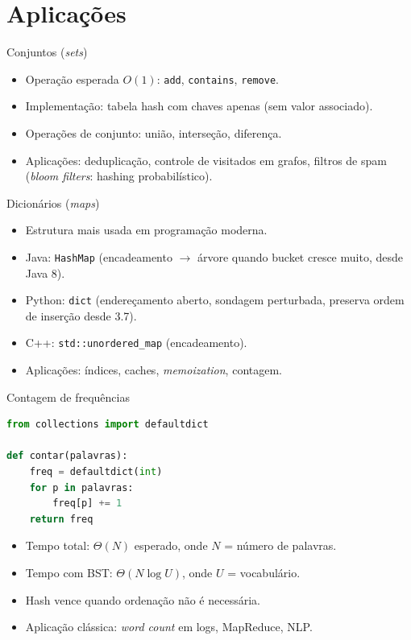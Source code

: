 \documentclass[aspectratio=169]{beamer}
\begin{document}
\section{Aplicações}

\begin{frame}{Conjuntos (\emph{sets})}
\begin{itemize}
    \item Operação esperada $O(1)$: \texttt{add}, \texttt{contains}, \texttt{remove}.
    \item Implementação: tabela hash com chaves apenas (sem valor associado).
    \item Operações de conjunto: união, interseção, diferença.
    \item Aplicações: deduplicação, controle de visitados em grafos, filtros de
    spam (\emph{bloom filters}: hashing probabilístico).
\end{itemize}
\end{frame}

\begin{frame}{Dicionários (\emph{maps})}
\begin{itemize}
    \item Estrutura mais usada em programação moderna.
    \item Java: \texttt{HashMap} (encadeamento $\to$ árvore quando bucket cresce muito,
    desde Java 8).
    \item Python: \texttt{dict} (endereçamento aberto, sondagem perturbada,
    preserva ordem de inserção desde 3.7).
    \item C++: \texttt{std::unordered\_map} (encadeamento).
    \item Aplicações: índices, caches, \emph{memoization}, contagem.
\end{itemize}
\end{frame}

\begin{frame}[fragile]{Contagem de frequências}
\begin{lstlisting}[language=Python]
from collections import defaultdict

def contar(palavras):
    freq = defaultdict(int)
    for p in palavras:
        freq[p] += 1
    return freq
\end{lstlisting}
\begin{itemize}
    \item Tempo total: $\Theta(N)$ esperado, onde $N$ = número de palavras.
    \item Tempo com BST: $\Theta(N \log U)$, onde $U$ = vocabulário.
    \item Hash vence quando ordenação não é necessária.
    \item Aplicação clássica: \emph{word count} em logs, MapReduce, NLP.
\end{itemize}
\end{frame}
\end{document}
